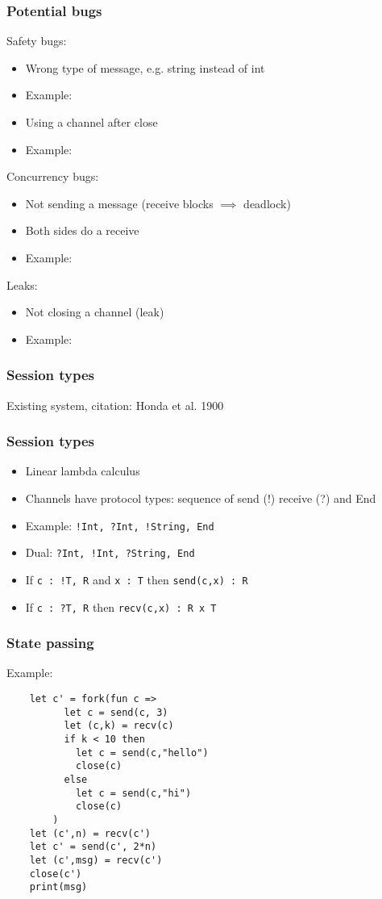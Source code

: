 \documentclass[aspectratio=169]{beamer}
\begin{document}
\begin{frame}[fragile]
  \frametitle{Potential bugs}

  Safety bugs:
  \begin{itemize}
    \item Wrong type of message, e.g. string instead of int
    \item Example:
    \item Using a channel after close
    \item Example:
  \end{itemize}

  Concurrency bugs:
  \begin{itemize}
    \item Not sending a message (receive blocks $\implies$ deadlock)
    \item Both sides do a receive
    \item Example:
  \end{itemize}

  Leaks:
  \begin{itemize}
    \item Not closing a channel (leak)
    \item Example:
  \end{itemize}
\end{frame}

\begin{frame}[fragile]
  \frametitle{Session types}

  Existing system, citation: Honda et al. 1900
\end{frame}

\begin{frame}[fragile]
  \frametitle{Session types}
  \begin{itemize}
    \item Linear lambda calculus
    \item Channels have protocol types: sequence of send (!) receive (?) and End
    \item Example: \lstinline|!Int, ?Int, !String, End|
    \item Dual: \lstinline|?Int, !Int, ?String, End|
    \item If \lstinline|c : !T, R| and \lstinline|x : T| then \lstinline|send(c,x) : R|
    \item If \lstinline|c : ?T, R| then \lstinline|recv(c,x) : R x T|
  \end{itemize}
\end{frame}

\begin{frame}[fragile]
  \frametitle{State passing}
  Example:
  \begin{lstlisting}
    let c' = fork(fun c =>
          let c = send(c, 3)
          let (c,k) = recv(c)
          if k < 10 then
            let c = send(c,"hello")
            close(c)
          else
            let c = send(c,"hi")
            close(c)
        )
    let (c',n) = recv(c')
    let c' = send(c', 2*n)
    let (c',msg) = recv(c')
    close(c')
    print(msg)
  \end{lstlisting}
\end{frame}
\end{document}
